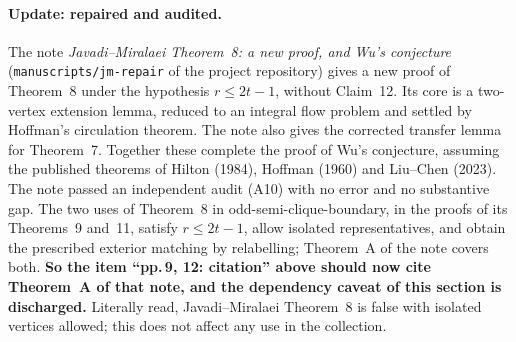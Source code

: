 \documentclass[11pt]{amsart}
\begin{document}
\paragraph{Update: repaired and audited.} The note \emph{Javadi--Miralaei Theorem~8: a new proof,
and Wu's conjecture} (\texttt{manuscripts/jm-repair} of the project repository) gives a new proof of
Theorem~8 under the hypothesis $r\le 2t-1$, without Claim~12. Its core is a two-vertex extension lemma,
reduced to an integral flow problem and settled by Hoffman's circulation theorem. The note also gives
the corrected transfer lemma for Theorem~7. Together these complete the proof of Wu's conjecture,
assuming the published theorems of Hilton (1984), Hoffman (1960) and Liu--Chen (2023). The note passed
an independent audit (A10) with no error and no substantive gap. The two uses of Theorem~8 in
odd-semi-clique-boundary, in the proofs of its Theorems~9 and~11, satisfy $r\le 2t-1$, allow isolated
representatives, and obtain the prescribed exterior matching by relabelling; Theorem~A of the note
covers both. \textbf{So the item ``pp.\,9, 12: citation'' above should now cite Theorem~A of that
note, and the dependency caveat of this section is discharged.} Literally read, Javadi--Miralaei
Theorem~8 is false with isolated vertices allowed; this does not affect any use in the collection.
\end{document}
